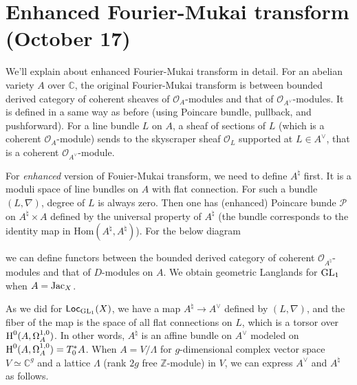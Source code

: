 \newpage
\section{Enhanced Fourier-Mukai transform (October 17)}

We'll explain about enhanced Fourier-Mukai transform in detail.
For an abelian variety $A$ over $\mathbb{C}$, the original Fourier-Mukai transform is between 
bounded derived category of coherent sheaves of $\mathcal{O}_A$-modules and that of $\mathcal{O}_{A^\vee}$-modules.
It is defined in a same way as before (using Poincare bundle, pullback, and pushforward).
For a line bundle $L$ on $A$, a sheaf of sections of $L$ (which is a coherent $\mathcal{O}_A$-module)
sends to the skyscraper sheaf $\mathcal{O}_L$ supported at $L \in A^\vee$, that is a coherent
$\mathcal{O}_{A^\vee}$-module.

For \emph{enhanced} version of Fouier-Mukai transform, we need to define $A^\natural$ first.
It is a moduli space of line bundles on $A$ with flat connection. 
For such a bundle $(L, \nabla)$, degree of $L$ is always zero.
Then one has (enhanced) Poincare bunde $\mathcal{P}$ on $A^\natural \times A$
defined by the universal property of $A^\natural$ (the bundle corresponds to the identity map in $\mathrm{Hom}(A^\natural, A^\natural)$).
For the below diagram
\begin{center}
\end{center}
we can define functors between the bounded derived category of coherent $\mathcal{O}_{A^\natural}$-modules and  
that of $D$-modules on $A$.
We obtain geometric Langlands for $\operatorname{\mathrm{GL}}_1$ when $A = \operatorname{\mathrm{Jac}}_X$.

As we did for $\operatorname{\mathsf{Loc}}_{\operatorname{\mathrm{GL}}_1}(X)$, we have a map $A^\natural \to A^\vee$ defined by $(L, \nabla)$, 
and the fiber of the map is the space of all flat connections on $L$, which is a torsor over $\operatorname{\mathrm{H}}^0(A, \Omega_A^{1, 0})$.
In other words, $A^\natural$ is an affine bundle on $A^\vee$ modeled on $\operatorname{\mathrm{H}}^0(A, \Omega_A^{1, 0}) = T_{0}^*A$.
When $A = V /\Lambda$ for $g$-dimensional complex vector space $V \simeq \mathbb{C}^g$ and a lattice
$\Lambda$ (rank $2g$ free $\mathbb{Z}$-module) in $V$, we can express $A^\vee$ and $A^\natural$ as follows.

